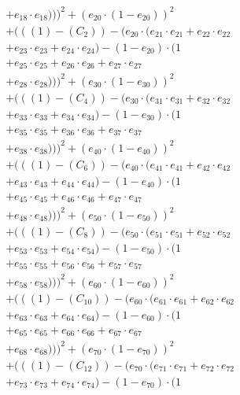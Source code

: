 \documentclass[10pt, a4paper]{article}
\begin{document}
\begin{align*}
& + e_{18} \cdot e_{18})))^{2} + (e_{20} \cdot (1 - e_{20}))^{2} \\
& + (((1) - (C_{2})) - (e_{20} \cdot (e_{21} \cdot e_{21} + e_{22} \cdot e_{22} \\
& + e_{23} \cdot e_{23} + e_{24} \cdot e_{24}) - (1 - e_{20}) \cdot (1 \\
& + e_{25} \cdot e_{25} + e_{26} \cdot e_{26} + e_{27} \cdot e_{27} \\
& + e_{28} \cdot e_{28})))^{2} + (e_{30} \cdot (1 - e_{30}))^{2} \\
& + (((1) - (C_{4})) - (e_{30} \cdot (e_{31} \cdot e_{31} + e_{32} \cdot e_{32} \\
& + e_{33} \cdot e_{33} + e_{34} \cdot e_{34}) - (1 - e_{30}) \cdot (1 \\
& + e_{35} \cdot e_{35} + e_{36} \cdot e_{36} + e_{37} \cdot e_{37} \\
& + e_{38} \cdot e_{38})))^{2} + (e_{40} \cdot (1 - e_{40}))^{2} \\
& + (((1) - (C_{6})) - (e_{40} \cdot (e_{41} \cdot e_{41} + e_{42} \cdot e_{42} \\
& + e_{43} \cdot e_{43} + e_{44} \cdot e_{44}) - (1 - e_{40}) \cdot (1 \\
& + e_{45} \cdot e_{45} + e_{46} \cdot e_{46} + e_{47} \cdot e_{47} \\
& + e_{48} \cdot e_{48})))^{2} + (e_{50} \cdot (1 - e_{50}))^{2} \\
& + (((1) - (C_{8})) - (e_{50} \cdot (e_{51} \cdot e_{51} + e_{52} \cdot e_{52} \\
& + e_{53} \cdot e_{53} + e_{54} \cdot e_{54}) - (1 - e_{50}) \cdot (1 \\
& + e_{55} \cdot e_{55} + e_{56} \cdot e_{56} + e_{57} \cdot e_{57} \\
& + e_{58} \cdot e_{58})))^{2} + (e_{60} \cdot (1 - e_{60}))^{2} \\
& + (((1) - (C_{10})) - (e_{60} \cdot (e_{61} \cdot e_{61} + e_{62} \cdot e_{62} \\
& + e_{63} \cdot e_{63} + e_{64} \cdot e_{64}) - (1 - e_{60}) \cdot (1 \\
& + e_{65} \cdot e_{65} + e_{66} \cdot e_{66} + e_{67} \cdot e_{67} \\
& + e_{68} \cdot e_{68})))^{2} + (e_{70} \cdot (1 - e_{70}))^{2} \\
& + (((1) - (C_{12})) - (e_{70} \cdot (e_{71} \cdot e_{71} + e_{72} \cdot e_{72} \\
& + e_{73} \cdot e_{73} + e_{74} \cdot e_{74}) - (1 - e_{70}) \cdot (1 \\

\end{align*}
\end{document}
